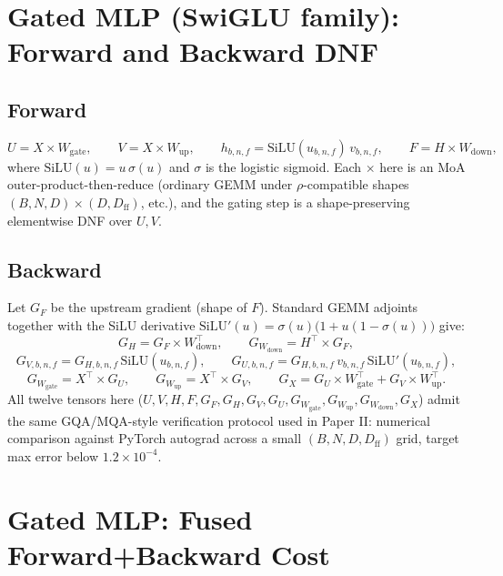 \documentclass[11pt]{article}
\theoremstyle{definition}
\begin{document}
\section{Gated MLP (SwiGLU family): Forward and Backward DNF}

\subsection{Forward}
\[
U = X \times W_{\mathrm{gate}}, \qquad
V = X \times W_{\mathrm{up}}, \qquad
h_{b,n,f} = \mathrm{SiLU}(u_{b,n,f})\, v_{b,n,f}, \qquad
F = H \times W_{\mathrm{down}},
\]
where $\mathrm{SiLU}(u) = u\,\sigma(u)$ and $\sigma$ is the logistic
sigmoid. Each $\times$ here is an MoA outer-product-then-reduce
(ordinary GEMM under $\rho$-compatible shapes $(B,N,D)\times(D,D_{\mathrm{ff}})$,
etc.), and the gating step is a shape-preserving elementwise DNF over
$U,V$.

\subsection{Backward}
Let $G_F$ be the upstream gradient (shape of $F$). Standard GEMM
adjoints together with the SiLU derivative $\mathrm{SiLU}'(u) =
\sigma(u)\big(1 + u(1-\sigma(u))\big)$ give:
\[
G_H = G_F \times W_{\mathrm{down}}^{\top}, \qquad
G_{W_{\mathrm{down}}} = H^{\top} \times G_F,
\]
\[
G_{V,b,n,f} = G_{H,b,n,f}\,\mathrm{SiLU}(u_{b,n,f}), \qquad
G_{U,b,n,f} = G_{H,b,n,f}\, v_{b,n,f}\,\mathrm{SiLU}'(u_{b,n,f}),
\]
\[
G_{W_{\mathrm{gate}}} = X^{\top}\times G_U, \qquad
G_{W_{\mathrm{up}}} = X^{\top}\times G_V, \qquad
G_X = G_U \times W_{\mathrm{gate}}^{\top} + G_V \times W_{\mathrm{up}}^{\top}.
\]
All twelve tensors here ($U,V,H,F,G_F,G_H,G_V,G_U,G_{W_{\mathrm{gate}}},
G_{W_{\mathrm{up}}},G_{W_{\mathrm{down}}},G_X$) admit the same
GQA/MQA-style verification protocol used in Paper II: numerical
comparison against PyTorch autograd across a small $(B,N,D,D_{\mathrm{ff}})$
grid, target max error below $1.2\times10^{-4}$.

\section{Gated MLP: Fused Forward+Backward Cost}
\end{document}
